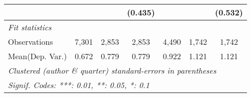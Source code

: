 \begin{tabular}{lcccccc}
                           &              &         & (0.435) &              &         & (0.532)\\   
   \midrule
   \emph{Fit statistics}\\
   Observations            & 7,301        & 2,853   & 2,853   & 4,490        & 1,742   & 1,742\\  
Mean(Dep. Var.) & 0.672 & 0.779 & 0.779 & 0.922 & 1.121 & 1.121 \\
   \midrule \midrule
   \multicolumn{7}{l}{\emph{Clustered (author \& quarter) standard-errors in parentheses}}\\
   \multicolumn{7}{l}{\emph{Signif. Codes: ***: 0.01, **: 0.05, *: 0.1}}\\
\end{tabular}
\par\endgroup
